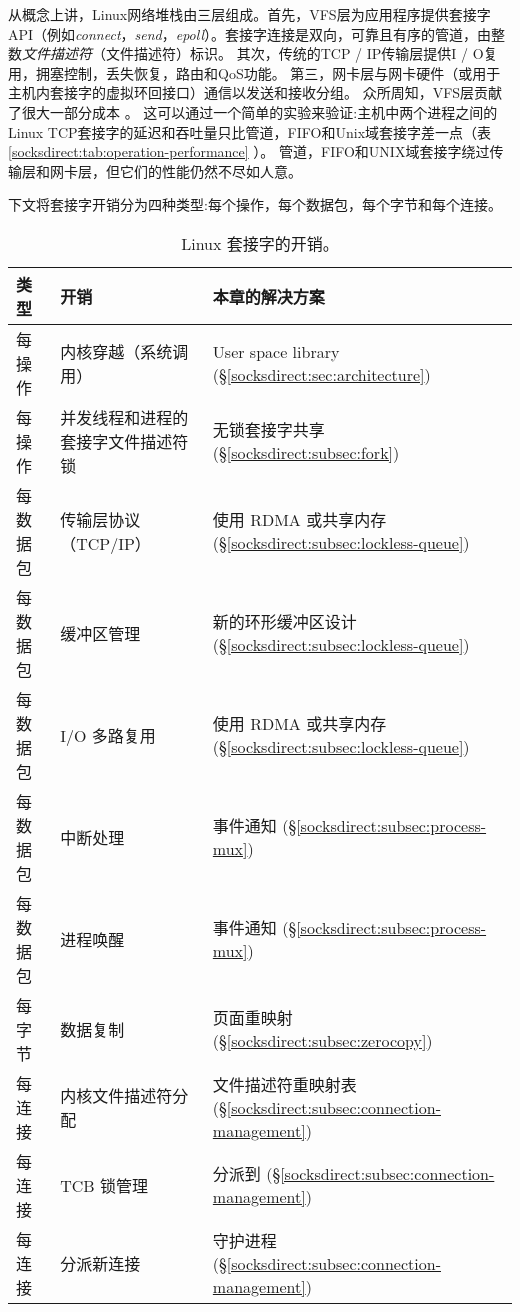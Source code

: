 从概念上讲，Linux网络堆栈由三层组成。首先，VFS层为应用程序提供套接字API（例如\emph {connect}，\emph {send}，\emph {epoll}）。套接字连接是双向，可靠且有序的管道，由整数\emph {文件描述符}（文件描述符）标识。
其次，传统的TCP / IP传输层提供I / O复用，拥塞控制，丢失恢复，路由和QoS功能。
第三，网卡层与网卡硬件（或用于主机内套接字的虚拟环回接口）通信以发送和接收分组。
众所周知，VFS层贡献了很大一部分成本 \cite {clark1989analysis,boyd2010analysis}。
这可以通过一个简单的实验来验证:主机中两个进程之间的Linux TCP套接字的延迟和吞吐量只比管道，FIFO和Unix域套接字差一点（表 \ref {socksdirect:tab:operation-performance} ）。
管道，FIFO和UNIX域套接字绕过传输层和网卡层，但它们的性能仍然不尽如人意。

下文将套接字开销分为四种类型:每个操作，每个数据包，每个字节和每个连接。


\begin{table}[t]
	\centering
	\caption{Linux 套接字的开销。}
	\label{socksdirect:tab:overhead}
	\small
		\begin{tabularx}{1\textwidth}{l|X|X}
			\hline
			类型 & 开销 & 本章的解决方案 \\
			\hline
			\hline
			每操作 & 内核穿越（系统调用） & User space library (\S\ref{socksdirect:sec:architecture}) \\
			\hline
			每操作 & 并发线程和进程的套接字文件描述符锁 & 无锁套接字共享 (\S\ref{socksdirect:subsec:fork}) \\
			\hline
			\hline
			每数据包 & 传输层协议（TCP/IP） & 使用 RDMA 或共享内存 (\S\ref{socksdirect:subsec:lockless-queue}) \\
			\hline
			每数据包 & 缓冲区管理 & 新的环形缓冲区设计 (\S\ref{socksdirect:subsec:lockless-queue}) \\
			\hline
			每数据包 & I/O 多路复用 & 使用 RDMA 或共享内存 (\S\ref{socksdirect:subsec:lockless-queue}) \\
			\hline
			每数据包 & 中断处理 & 事件通知 (\S\ref{socksdirect:subsec:process-mux}) \\
			\hline
			每数据包 & 进程唤醒 & 事件通知 (\S\ref{socksdirect:subsec:process-mux}) \\
			\hline
			\hline
			每字节 & 数据复制 & 页面重映射 (\S\ref{socksdirect:subsec:zerocopy}) \\
			\hline
			\hline
			每连接  & 内核文件描述符分配 & 文件描述符重映射表 (\S\ref{socksdirect:subsec:connection-management}) \\
			\hline
			每连接 & TCB 锁管理 & 分派到 \libipc{} (\S\ref{socksdirect:subsec:connection-management}) \\
			\hline
			每连接 & 分派新连接 & 守护进程 (\S\ref{socksdirect:subsec:connection-management}) \\
			\hline
		\end{tabularx}
\end{table}


